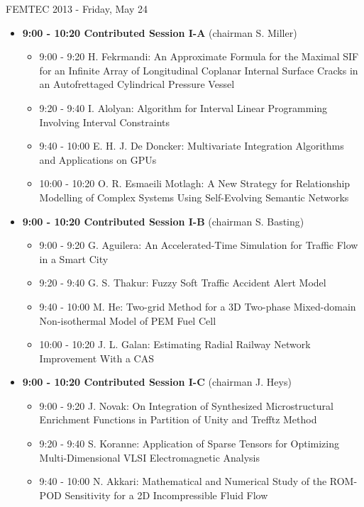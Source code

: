 \documentclass[10pt]{article}%
\begin{document}
\centerline{\huge FEMTEC 2013 - Friday, May 24}
\vspace{4mm}
\begin{itemize}    
\item {\bf 9:00 - 10:20 Contributed Session I-A} (chairman S. Miller) 
  \begin{itemize}
    \item 9:00 - 9:20 {H. Fekrmandi}: {An Approximate Formula for the Maximal SIF for an Infinite Array of Longitudinal Coplanar Internal Surface Cracks in an Autofrettaged Cylindrical Pressure Vessel} %
    \item 9:20 - 9:40 {I. Alolyan}: {Algorithm for Interval Linear  Programming Involving Interval Constraints} %
    \item 9:40 - 10:00 {E. H. J. De Doncker}: {Multivariate Integration Algorithms and Applications on GPUs} %
    \item 10:00 - 10:20 {O. R. Esmaeili Motlagh}: {A New Strategy for Relationship Modelling of Complex Systems Using Self-Evolving Semantic Networks}
  \end{itemize}
  \item {\bf 9:00 - 10:20 Contributed Session I-B} (chairman S. Basting) 
  \begin{itemize}
    \item 9:00 - 9:20 {G. Aguilera}: {An Accelerated-Time Simulation for Traffic Flow in a Smart City} %
    \item 9:20 - 9:40 {G. S. Thakur}: {Fuzzy Soft Traffic Accident Alert Model}
    \item 9:40 - 10:00 {M. He}: {Two-grid Method for a 3D Two-phase Mixed-domain Non-isothermal Model of PEM Fuel Cell}
    \item 10:00 - 10:20 {J. L. Galan}: {Estimating Radial Railway Network Improvement With a CAS} %
  \end{itemize}
    \item {\bf 9:00 - 10:20 Contributed Session I-C} (chairman J. Heys) 
  \begin{itemize}
    \item 9:00 - 9:20 {J. Novak}: {On Integration of Synthesized Microstructural Enrichment Functions in Partition of Unity and Trefftz Method}
    \item 9:20 - 9:40 {S. Koranne}: {Application of Sparse Tensors for Optimizing Multi-Dimensional VLSI Electromagnetic Analysis}
    \item 9:40 - 10:00 {N. Akkari}: {Mathematical and Numerical Study of the ROM-POD Sensitivity for a 2D Incompressible Fluid Flow}

\end{itemize}
\end{itemize}
\end{document}
